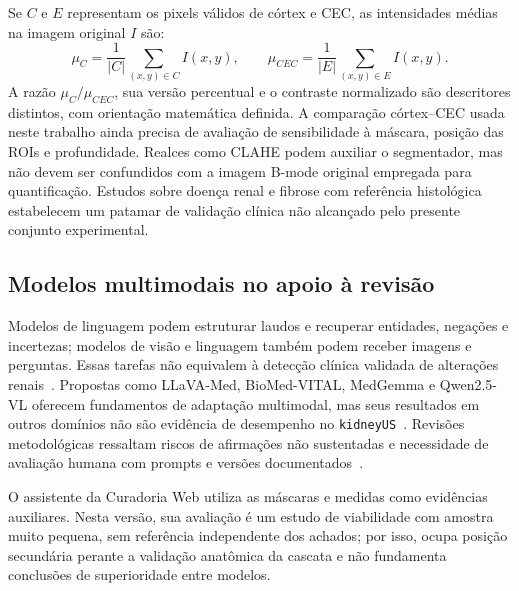\documentclass[12pt]{article}
\begin{document}
Se $C$ e $E$ representam os pixels válidos de córtex e CEC, as intensidades médias na imagem original $I$ são:
\begin{equation}
 \mu_C=\frac{1}{|C|}\sum_{(x,y)\in C}I(x,y),\qquad
 \mu_{CEC}=\frac{1}{|E|}\sum_{(x,y)\in E}I(x,y).
 \label{eq:fundamentacao_media_echo}
\end{equation}
A razão $\mu_C/\mu_{CEC}$, sua versão percentual e o contraste normalizado são descritores distintos, com orientação matemática definida. A comparação córtex--CEC usada neste trabalho ainda precisa de avaliação de sensibilidade à máscara, posição das ROIs e profundidade. Realces como CLAHE podem auxiliar o segmentador, mas não devem ser confundidos com a imagem B-mode original empregada para quantificação. Estudos sobre doença renal e fibrose com referência histológica~\cite{Athavale2021,Qin2024Fibrosis} estabelecem um patamar de validação clínica não alcançado pelo presente conjunto experimental.

\subsection{Modelos multimodais no apoio à revisão}
Modelos de linguagem podem estruturar laudos e recuperar entidades, negações e incertezas; modelos de visão e linguagem também podem receber imagens e perguntas. Essas tarefas não equivalem à detecção clínica validada de alterações renais~\cite{Wang2025KidneyNLP,Reichenpfader2024RadiologyIE,Busch2025RadiologyStructuredLLM}. Propostas como LLaVA-Med, BioMed-VITAL, MedGemma e Qwen2.5-VL oferecem fundamentos de adaptação multimodal, mas seus resultados em outros domínios não são evidência de desempenho no \texttt{kidneyUS}~\cite{Li2023LLaVAMed,Cui2024BioMedVITAL,Sellergren2026MedGemma,Bai2025Qwen25VL}. Revisões metodológicas ressaltam riscos de afirmações não sustentadas e necessidade de avaliação humana com prompts e versões documentados~\cite{Artsi2025RadiologyLLMReview,Bluethgen2025RadiologyLLMBestPractices}.

O assistente da Curadoria Web utiliza as máscaras e medidas como evidências auxiliares. Nesta versão, sua avaliação é um estudo de viabilidade com amostra muito pequena, sem referência independente dos achados; por isso, ocupa posição secundária perante a validação anatômica da cascata e não fundamenta conclusões de superioridade entre modelos.
\end{document}
